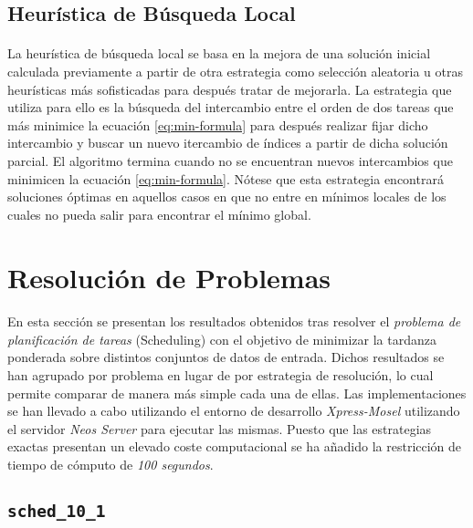 \documentclass[spanish]{article}
\begin{document}
		\subsection{Heurística de Búsqueda Local}
		\label{sec:local-search-heuristic}

			\paragraph{}
			La heurística de búsqueda local se basa en la mejora de una solución inicial calculada previamente a partir de otra estrategia como selección aleatoria u otras heurísticas más sofisticadas para después tratar de mejorarla. La estrategia que utiliza para ello es la búsqueda del intercambio entre el orden de dos tareas que más minimice la ecuación \eqref{eq:min-formula} para después realizar fijar dicho intercambio y buscar un nuevo itercambio de índices a partir de dicha solución parcial. El algoritmo termina cuando no se encuentran nuevos intercambios que minimicen la ecuación \eqref{eq:min-formula}. Nótese que esta estrategia encontrará soluciones óptimas en aquellos casos en que no entre en mínimos locales de los cuales no pueda salir para encontrar el mínimo global.


	\section{Resolución de Problemas}
	\label{sec:problems}

		\paragraph{}
		En esta sección se presentan los resultados obtenidos tras resolver el \emph{problema de planificación de tareas} (Scheduling) con el objetivo de minimizar la tardanza ponderada sobre distintos conjuntos de datos de entrada. Dichos resultados se han agrupado por problema en lugar de por estrategia de resolución, lo cual permite comparar de manera más simple cada una de ellas. Las implementaciones se han llevado a cabo utilizando el entorno de desarrollo \emph{Xpress-Mosel} \cite{tool:xpress-mosel} utilizando el servidor \emph{Neos Server} \cite{tool:neos-server} para ejecutar las mismas. Puesto que las estrategias exactas presentan un elevado coste computacional se ha añadido la restricción de tiempo de cómputo de \emph{100 segundos}.

		\subsection{\texttt{sched\_10\_1}}
\end{document}
